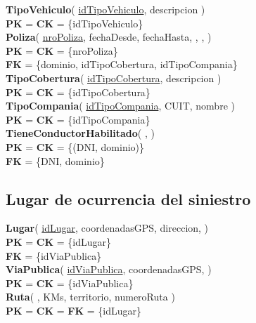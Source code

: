 \textbf{TipoVehiculo}(
    \uline{idTipoVehiculo},
    descripcion
)\\
\textbf{PK} = \textbf{CK} = \{idTipoVehiculo\}\\

\textbf{Poliza}(
    \uline{nroPoliza},
    fechaDesde,
    fechaHasta,
    ,
    ,
)\\
\textbf{PK} = \textbf{CK} = \{nroPoliza\}\\
\textbf{FK} = \{dominio, idTipoCobertura, idTipoCompania\}\\

\textbf{TipoCobertura}(
    \uline{idTipoCobertura},
    descripcion
)\\
\textbf{PK} = \textbf{CK} = \{idTipoCobertura\}\\

\textbf{TipoCompania}(
    \uline{idTipoCompania},
    CUIT,
    nombre
)\\
\textbf{PK} = \textbf{CK} = \{idTipoCompania\}\\

\textbf{TieneConductorHabilitado}(
    \uline{},
    \uline{}
)\\
\textbf{PK} = \textbf{CK} = \{(DNI, dominio)\}\\
\textbf{FK} = \{DNI, dominio\}



\subsection{Lugar de ocurrencia del siniestro}

\textbf{Lugar}(
    \uline{idLugar},
    coordenadasGPS,
    direccion,
)\\
\textbf{PK} = \textbf{CK} = \{idLugar\}\\
\textbf{FK} = \{idViaPublica\}\\

\textbf{ViaPublica}(
    \uline{idViaPublica},
    coordenadasGPS,
)\\
\textbf{PK} = \textbf{CK} = \{idViaPublica\}\\


\textbf{Ruta}(
    \uline{},
    KMs,
    territorio,
    numeroRuta
)\\
\textbf{PK} = \textbf{CK} = \textbf{FK} = \{idLugar\}\\

